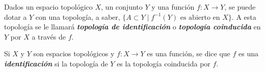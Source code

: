 

\begin{definition}
Dados un espacio topológico $X$, un conjunto $Y$ y una función $f : X \longrightarrow Y$, se puede dotar a $Y$ con una topología, a saber, $\{ A \subset Y \mid f^{-1}(Y) \text{ es abierto en } X \}$. A esta topología se le llamará \emph{\bfseries topología de identificación} o \emph{\bfseries topología coinducida} en $Y$ por $X$ a través de $f$.
\end{definition}

\begin{definition}
Si $X$ y $Y$ son espacios topológicos y $f : X \longrightarrow Y$ es una función, se dice que $f$ es una \emph{\bfseries identificación} si la topología de $Y$ es la topología coinducida por $f$.
\end{definition}
